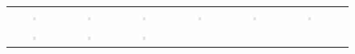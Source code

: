 \documentclass{article}
\begin{document}
\begin{figure}[htbp]
\begin{tabular}{ccccccc}
    \includegraphics[width=0.2\textwidth]{assets/deform_0400.png} &
    \includegraphics[width=0.2\textwidth]{assets/deform_0450.png} & 
    \includegraphics[width=0.2\textwidth]{assets/deform_0500.png} & 
    \includegraphics[width=0.2\textwidth]{assets/deform_0550.png} &
    \includegraphics[width=0.2\textwidth]{assets/deform_0600.png} & 
    \includegraphics[width=0.2\textwidth]{assets/deform_0650.png} \\ 
    \includegraphics[width=0.2\textwidth]{assets/deform_0700.png} &
    \includegraphics[width=0.2\textwidth]{assets/deform_0750.png} & 
    \includegraphics[width=0.2\textwidth]{assets/deform_0800.png} & 

\end{tabular}
\end{figure}
\end{document}
